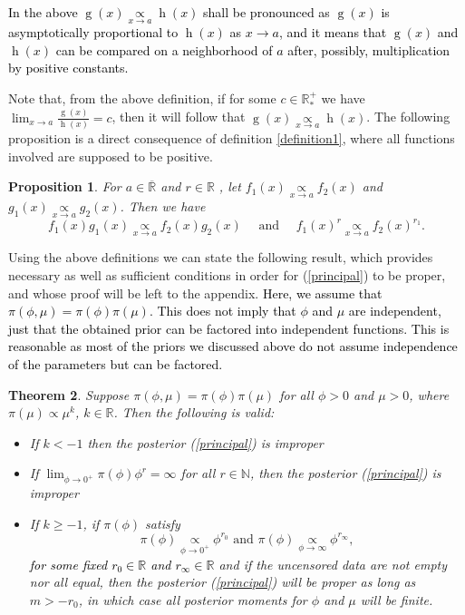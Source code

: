 \documentclass[]{interact}
\newcommand{\f}{\operatorname}
\newcommand{\R}{\mathbb{R}}
\theoremstyle{plain}%
\newtheorem{theorem}{Theorem}[section]
\newtheorem{proposition}[theorem]{Proposition}
\theoremstyle{definition}
\theoremstyle{remark}
\begin{document}
\textcolor{black}{In the above $\f{g}(x)\underset{x\to a}{\propto} \f{h}(x)$ shall be pronounced as $\f{g}(x)$ is asymptotically proportional to $\f{h}(x)$ as $x\to a$, and it means that $\f{g}(x)$ and $\f{h}(x)$ can be compared on a neighborhood of $a$ after, possibly, multiplication by positive constants.} 

Note that, from the above definition, if for some $c\in \mathbb{R}^+_*$ we have $\lim_{x\to a} \frac{\f{g}(x)}{\f{h}(x)} = c$, then it will follow that $\f{g}(x)\underset{x\to a}{\propto} \f{h}(x)$. The following proposition is a direct consequence of definition \ref{definition1}, where all functions involved are supposed to be positive.

\begin{proposition}\label{properties} For $a\in\overline{\mathbb{R}}$ and $r\in\mathbb{R}$ , let $f_1(x)\underset{x\to a}{\propto} f_2(x)$ and $g_1(x)\underset{x\to a}{\propto} g_2(x)$. Then we have
\begin{equation*}
f_1(x)g_1(x)\underset{x\to a}{\propto}f_2(x)g_2(x) \quad \mbox{ and } \quad f_1(x)^r\underset{x\to a}{\propto}f_2(x)^{r_1}.
\end{equation*}

\end{proposition} 

Using the above definitions we can state the following result, which provides necessary as well as sufficient conditions in order for (\ref{principal}) to be proper, and whose proof will be left to the appendix. \textcolor{black}{Here, we assume that $\pi(\phi,\mu) = \pi(\phi)\pi(\mu)$. This does not imply that $\phi$ and $\mu$ are independent, just that the obtained prior can be factored into independent functions. This is reasonable as most of the priors we discussed above do not assume independence of the parameters but can be factored.}

\begin{theorem}\label{mainth} Suppose $\pi(\phi,\mu) = \pi(\phi)\pi(\mu)$ for all $\phi>0$ and $\mu>0$, where $\pi(\mu)\propto \mu^k$, $k\in \mathbb{R}$. Then the following is valid:
\begin{itemize}
    \item[(i)] If $k< -1$ then the posterior (\ref{principal}) is improper
    \item[(ii)] If $\lim_{\phi\to 0^+}\pi(\phi)\phi^r = \infty$ for all $r\in \mathbb{N}$, then the posterior (\ref{principal}) is improper
    \item[(iii)] If $k\geq -1$, if $\pi(\phi)$ satisfy
    \begin{equation*} \pi(\phi)\underset{\phi\to 0^+}{\propto} \phi^{r_0}\mbox{ and }\pi(\phi)\underset{\phi\to \infty}{\propto} \phi^{r_\infty},
    \end{equation*}
    \textcolor{black}{for some fixed $r_0\in \R$ and $r_\infty\in \R$} and if the uncensored data are not empty nor all equal, then the posterior (\ref{principal}) will be proper as long as $m>-r_0$, in which case all posterior moments for $\phi$ and $\mu$ will be finite.
\end{itemize}

\end{theorem}
\end{document}
